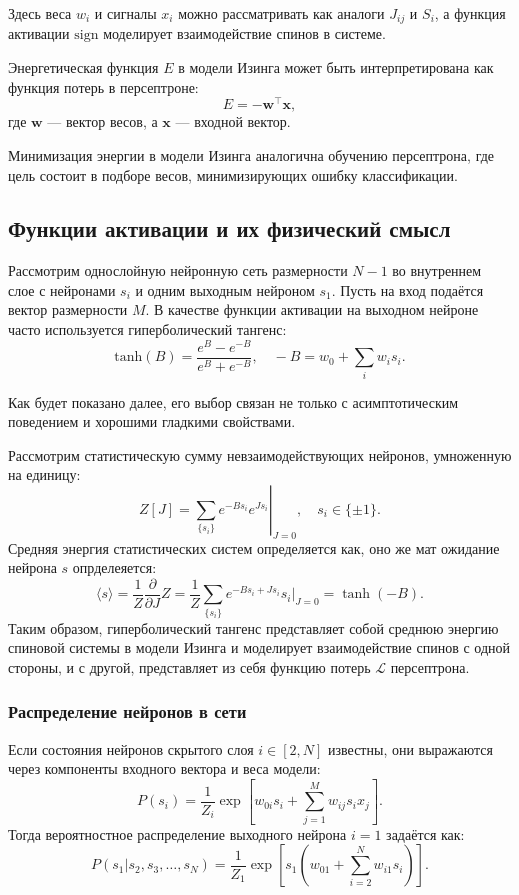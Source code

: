 \begin{description}
Здесь веса $w_i$ и сигналы $x_i$ можно рассматривать как аналоги $J_{ij}$ и $S_i$, а функция активации $\mathrm{sign}$ моделирует взаимодействие спинов в системе.

Энергетическая функция $E$ в модели Изинга может быть интерпретирована как функция потерь в персептроне:
\[
E = - \mathbf{w}^\top \mathbf{x},
\]
где $\mathbf{w}$ — вектор весов, а $\mathbf{x}$ — входной вектор.

Минимизация энергии в модели Изинга аналогична обучению персептрона, где цель состоит в подборе весов, минимизирующих ошибку классификации.

\subsection{Функции активации и их физический смысл}

Рассмотрим однослойную нейронную сеть размерности $N - 1$ во внутреннем слое с нейронами $s_i$ и одним выходным нейроном $s_1$. Пусть на вход подаётся вектор размерности $M$. В качестве функции активации на выходном нейроне часто используется гиперболический тангенс:
\[
\mathrm{tanh}(B) = \frac{e^{B} - e^{-B}}{e^{B} + e^{-B}}, \quad -B = w_0 + \sum_i w_i s_i.
\]

Как будет показано далее, его выбор связан не только с асимптотическим поведением и хорошими гладкими свойствами. 

Рассмотрим статистическую сумму невзаимодействующих нейронов, умноженную на единицу:
\[
Z[J] = \left.\sum_{\{s_i\}} e^{-B s_i} e^{J s_i} \right|_{J=0}, \quad s_i \in \{\pm 1\}.
\]
Средняя энергия статистических систем определяется как, оно же мат ожидание нейрона $s$ опрделеяется:
\[
\langle s \rangle = \frac{1}{Z} \frac{\partial}{\partial J} Z = \frac{1}{Z} \sum_{\{s_i\}} e^{-B s_i + J s_i} s_i \bigg|_{J=0} = \tanh(-B).
\]
Таким образом, гиперболический тангенс представляет собой среднюю энергию спиновой системы в модели Изинга и моделирует взаимодействие спинов с одной стороны, и с другой, представляет из себя функцию потерь $\mathcal{L}$  персептрона.

\subsubsection*{Распределение нейронов в сети}

Если состояния нейронов скрытого слоя $i \in [2, N]$ известны, они выражаются через компоненты входного вектора и веса модели:
\[
P(s_i) = \frac{1}{Z_i} \exp\left[ w_{0i} s_i + \sum_{j=1}^M w_{ij} s_i x_j \right].
\]
Тогда вероятностное распределение выходного нейрона $i = 1$ задаётся как:
\[
P(s_1 | s_2, s_3, \dots, s_N) = \frac{1}{Z_1} \exp\left[ s_1 \left( w_{01} + \sum_{i=2}^N w_{i1} s_i \right) \right].
\]


\end{description}
